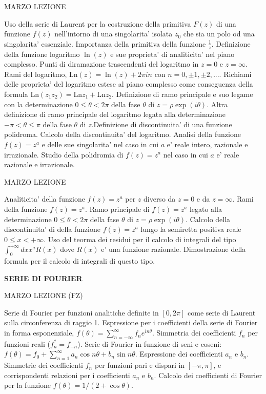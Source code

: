 \documentclass[,12pt]{article}
\begin{document}
\vskip 20pt
 MARZO
\hskip 20pt
LEZIONE

\noindent
Uso della serie di Laurent per la costruzione della primitiva $F(z)$ di
una funzione $f(z)$ nell'intorno di una singolarita' isolata $z_0$ che
sia un polo od una singolarita' essenziale. Importanza della primitiva
della funzione $\frac{1}{z}$. Definizione della funzione logaritmo $\ln(
z)$ e sue proprieta' di analiticita' nel piano complesso. Punti di
diramazione trascendenti del logaritmo in $z=0$ e $z=\infty$. Rami del
logaritmo, Ln$(z)=\ln(z)+2\pi in$ con $n=0,\pm1,\pm2,...$.
Richiami delle proprieta' del logaritmo estese al piano
complesso come conseguenza della formula Ln$(z_1z_2)=$Ln$z_1+$Ln$z_2$.
Definizione di ramo principale e suo legame con la determinazione
$0\leq \theta<2\pi$ della fase $\theta$ di $z=\rho \exp(i\theta)$. Altra
definizione di ramo principale del logaritmo legata alla determinazione
$-\pi<
\theta\leq\pi$ della fase $\theta$ di $z$.Definizione di discontinuita' di
una funzione polidroma. Calcolo della discontinuita' del logaritmo.
Analisi della funzione $f(z)=z^a$ e delle sue singolarita' nel caso in
cui $a$ e' reale intero, razionale e irrazionale. Studio della polidromia
di
$f(z)=z^a$ nel caso in cui $a$ e' reale razionale e irrazionale.   
 

\vskip 20pt
 MARZO
\hskip 20pt
LEZIONE

\noindent
Analiticita' della funzione $f(z)=z^a$ per $z$ diverso da $z=0$ e da
$z=\infty$. Rami della funzione $f(z)=z^a$. Ramo principale di
$f(z)=z^a$ legato alla determinazione
$0\leq \theta<2\pi$ della fase $\theta$ di $z=\rho \exp(i\theta)$. Calcolo
della discontinuita' di della funzione $f(z)=z^a$ lungo la semiretta
positiva reale $0\leq x<+\infty$. Uso del teorma dei residui per il
calcolo di integrali del tipo $\int_0^{+\infty}dx x^a R(x)$ dove $R(x)$
e' una funzione razionale. Dimostrazione della formula per il calcolo di
integrali di questo tipo. 

\vskip 20pt

\centerline {\bf SERIE DI FOURIER}

\vskip 20pt
 MARZO
\hskip 20pt
LEZIONE (FZ)

\noindent
Serie di Fourier per funzioni analitiche definite in $[0,2\pi]$ 
come serie di Laurent sulla
circonferenza di raggio 1. Espressione per i coefficienti della serie
di Fourier in forma esponenziale,
$f(\theta)=\sum_{n=-\infty}^\infty f_n e^{in\theta}$.
Simmetria dei coefficienti $f_n$ per funzioni reali ($f^*_n=f_{-n}$).
Serie di Fourier in funzione di seni e coseni:
$f(\theta)= f_0 + \sum_{n=1}^\infty a_n \cos n \theta + b_n \sin n \theta$.
Espressione dei coefficienti $a_n$ e $b_n$. Simmetrie dei coefficienti $f_n$
per funzioni pari e dispari in $[-\pi,\pi]$, e corrispondenti relazioni
per i coefficienti $a_n$ e $b_n$.
Calcolo dei coefficienti di Fourier per la funzione 
$f(\theta)=1/(2+\cos \theta)$.
\end{document}
